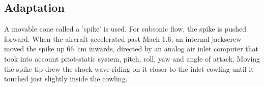 \subsection{Adaptation}
A movable cone called a 'spike' is used. For subsonic flow, the spike is pushed forward. When the aircraft accelerated past Mach 1.6, an internal jackscrew moved the spike up \SI{66}{\centi\meter} inwards, directed by an analog air inlet computer that took into account pitot-static system, pitch, roll, yaw and angle of attack. Moving the spike tip drew the shock wave riding on it closer to the inlet cowling until it touched just slightly inside the cowling.